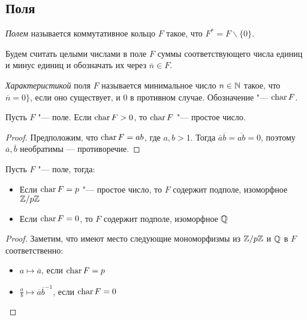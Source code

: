 \subsection{Поля}

\begin{definition}
	\textit{Полем} называется коммутативное кольцо $F$ такое, что $F^* = F \backslash \{0\}$.
\end{definition}

\begin{note}
	Будем считать целыми числами в поле $F$ суммы соответствующего числа единиц и минус единиц и обозначать их через $\overline{n} \in F$.
\end{note}

\pagebreak

\begin{definition}
	\textit{Характеристикой} поля $F$ называется минимальное число $n \in \mathbb{N}$ такое, что $\overline{n} = 0\}$, если оно существует, и $0$ в противном случае. Обозначение "--- $\operatorname{char}{F}$.
\end{definition}

\begin{proposition}
	Пусть $F$ "--- поле. Если $\operatorname{char}{F} > 0$, то $\operatorname{char}{F}$ "--- простое число.
\end{proposition}

\begin{proof}
	Предположим, что $\operatorname{char}{F} = ab$, где $a, b > 1$. Тогда $\overline{a}\overline{b} = \overline{ab} = 0$, поэтому $\overline{a}, \overline{b}$ необратимы --- противоречие.
\end{proof}

\begin{theorem}
	Пусть $F$ "--- поле, тогда:
	\begin{itemize}
		\item Если $\operatorname{char}{F} = p$ "--- простое число, то $F$ содержит подполе, изоморфное $\mathbb{Z} / p\mathbb{Z}$
		\item Если $\operatorname{char}{F} = 0$, то $F$ содержит подполе, изоморфное $\mathbb{Q}$
	\end{itemize}
\end{theorem}

\begin{proof}
	Заметим, что имеют место следующие мономорфизмы из $\mathbb{Z} / p\mathbb{Z}$ и $\mathbb{Q}$ в $F$ соответственно:
	\begin{itemize}
		\item $a \mapsto \overline{a}$, если $\operatorname{char}{F} = p$
		\item $\frac{a}{b} \mapsto \overline{a}\overline{b}^{-1}$, если $\operatorname{char}{F} = 0$\qedhere
	\end{itemize}
\end{proof}

